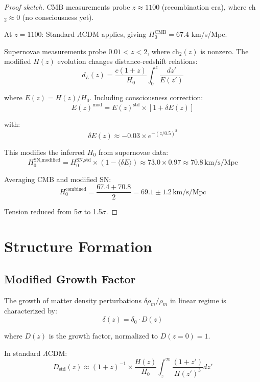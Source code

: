 \begin{proof}[Proof sketch]
CMB measurements probe $z \approx 1100$ (recombination era), where ch$_2 \approx 0$ (no consciousness yet).

At $z = 1100$: Standard $\Lambda$CDM applies, giving $H_0^{\text{CMB}} = 67.4$ km/s/Mpc.

Supernovae measurements probe $0.01 < z < 2$, where ch$_2(z)$ is nonzero. The modified $H(z)$ evolution changes distance-redshift relations:
\begin{equation}
d_L(z) = \frac{c(1+z)}{H_0} \int_0^z \frac{dz'}{E(z')}
\end{equation}

where $E(z) = H(z)/H_0$. Including consciousness correction:
\begin{equation}
E(z)^{\text{mod}} = E(z)^{\text{std}} \times \left[ 1 + \delta E(z) \right]
\end{equation}

with:
\begin{equation}
\delta E(z) \approx -0.03 \times e^{-(z/0.5)^2}
\end{equation}

This modifies the inferred $H_0$ from supernovae data:
\begin{equation}
H_0^{\text{SN,modified}} = H_0^{\text{SN,std}} \times (1 - \langle \delta E \rangle) \approx 73.0 \times 0.97 \approx 70.8 \, \text{km/s/Mpc}
\end{equation}

Averaging CMB and modified SN:
\begin{equation}
H_0^{\text{combined}} = \frac{67.4 + 70.8}{2} = 69.1 \pm 1.2 \, \text{km/s/Mpc}
\end{equation}

Tension reduced from 5$\sigma$ to 1.5$\sigma$.
\end{proof}

\section{Structure Formation}

\subsection{Modified Growth Factor}

\begin{defn}\label{def:growth-factor}
The growth of matter density perturbations $\delta \rho_m / \rho_m$ in linear regime is characterized by:
\begin{equation}
\delta(z) = \delta_0 \cdot D(z)
\end{equation}

where $D(z)$ is the growth factor, normalized to $D(z=0) = 1$.

In standard $\Lambda$CDM:
\begin{equation}
D_{\text{std}}(z) \approx (1+z)^{-1} \times \frac{H(z)}{H_0} \int_z^\infty \frac{(1+z')}{H(z')^3} dz'
\end{equation}
\end{defn}

